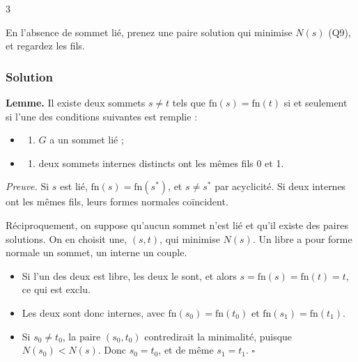 \documentclass[11pt,a4paper]{article}
\providecommand{\tightlist}{\setlength{\itemsep}{0pt}\setlength{\parskip}{0pt}}
\begin{document}
\begin{indication}{3}

En l'absence de sommet lié, prenez une paire solution qui minimise \(N(s)\) (Q9), et regardez les fils.

\end{indication}

\hypertarget{solution-15}{%
\subsubsection{Solution}\label{solution-15}}

\textbf{Lemme.} Il existe deux sommets \(s\neq t\) tels que \(\mathrm{fn}(s)=\mathrm{fn}(t)\) si et seulement si l'une des conditions suivantes est remplie :

\begin{itemize}
\item
  \begin{enumerate}
  \def\labelenumi{(\roman{enumi})}
  \tightlist
  \item
    \(G\) a un sommet lié ;
  \end{enumerate}
\item
  \begin{enumerate}
  \def\labelenumi{(\roman{enumi})}
  \setcounter{enumi}{1}
  \tightlist
  \item
    deux sommets internes distincts ont les mêmes fils 0 et 1.
  \end{enumerate}
\end{itemize}

\emph{Preuve.} Si \(s\) est lié, \(\mathrm{fn}(s)=\mathrm{fn}(s^*)\), et \(s\neq s^*\) par acyclicité. Si deux internes ont les mêmes fils, leurs formes normales coïncident.

Réciproquement, on suppose qu'aucun sommet n'est lié et qu'il existe des paires solutions. On en choisit une, \((s,t)\), qui minimise \(N(s)\). Un libre a pour forme normale un sommet, un interne un couple.

\begin{itemize}
\tightlist
\item
  Si l'un des deux est libre, les deux le sont, et alors \(s=\mathrm{fn}(s)=\mathrm{fn}(t)=t\), ce qui est exclu.
\item
  Les deux sont donc internes, avec \(\mathrm{fn}(s_0)=\mathrm{fn}(t_0)\) et \(\mathrm{fn}(s_1)=\mathrm{fn}(t_1)\).
\item
  Si \(s_0\neq t_0\), la paire \((s_0,t_0)\) contredirait la minimalité, puisque \(N(s_0)<N(s)\). Donc \(s_0=t_0\), et de même \(s_1=t_1\). \(\square\)
\end{itemize}
\end{document}
